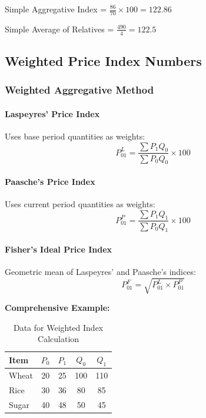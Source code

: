 \documentclass[twoside]{book}
\begin{document}
Simple Aggregative Index = $\frac{86}{70} \times 100 = 122.86$

Simple Average of Relatives = $\frac{490}{4} = 122.5$

\subsection{Weighted Price Index Numbers}

\subsubsection{Weighted Aggregative Method}

\paragraph{Laspeyres' Price Index}
Uses base period quantities as weights:
\begin{equation}
    P_{01}^L = \frac{\sum P_1 Q_0}{\sum P_0 Q_0} \times 100
\end{equation}

\paragraph{Paasche's Price Index}
Uses current period quantities as weights:
\begin{equation}
    P_{01}^P = \frac{\sum P_1 Q_1}{\sum P_0 Q_1} \times 100
\end{equation}

\paragraph{Fisher's Ideal Price Index}
Geometric mean of Laspeyres' and Paasche's indices:
\begin{equation}
    P_{01}^F = \sqrt{P_{01}^L \times P_{01}^P}
\end{equation}

\textbf{Comprehensive Example:}

\begin{table}[h]
\centering
\caption{Data for Weighted Index Calculation}
\begin{tabular}{lcccc}
\toprule
\textbf{Item} & $P_0$ & $P_1$ & $Q_0$ & $Q_1$ \\
\midrule
Wheat & 20 & 25 & 100 & 110 \\
Rice & 30 & 36 & 80 & 85 \\
Sugar & 40 & 48 & 50 & 45 \\
\bottomrule
\end{tabular}
\end{table}
\end{document}
